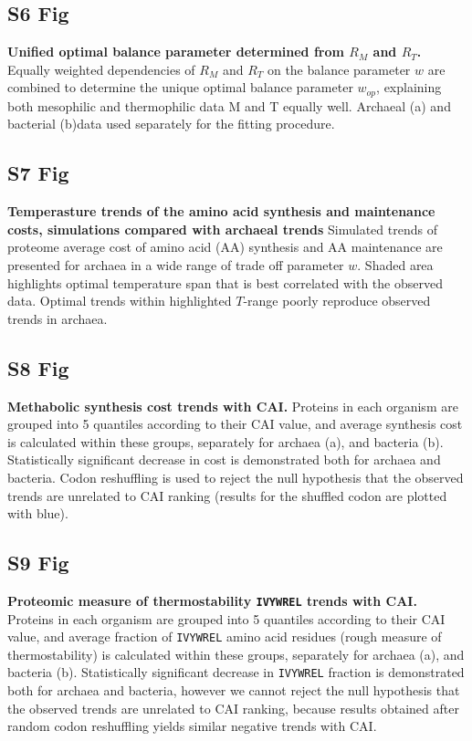 \documentclass[10pt,letterpaper]{article}
\begin{document}
\subsection*{S6 Fig}
\label{fig:s6}
{\bf Unified optimal balance parameter determined from $R_M$ and $R_T$.}
Equally weighted dependencies of $R_M$ and $R_T$ on the balance parameter $w$ are combined to determine the unique optimal balance parameter $w_{op}$, explaining both mesophilic and thermophilic data M and T equally well. Archaeal (a) and bacterial (b)data used separately for the fitting procedure.


\subsection*{S7 Fig}
\label{fig:s7}
{\bf Temperasture trends of the amino acid synthesis and maintenance costs, simulations compared with archaeal trends}
Simulated trends of proteome average cost of amino acid (AA) synthesis and AA maintenance are presented for archaea in a wide range of trade off parameter $w$. Shaded area highlights optimal temperature span that is best correlated with the observed data. Optimal trends within highlighted $T$-range poorly reproduce observed trends in archaea.


\subsection*{S8 Fig}
\label{fig:s8}
{\bf Methabolic synthesis cost trends with CAI.}
Proteins in each organism are grouped into 5 quantiles according to their CAI value, and average synthesis cost is calculated within these groups, separately for archaea (a), and bacteria (b). Statistically significant decrease in cost is demonstrated both for archaea and bacteria. Codon reshuffling is used to reject the null hypothesis that the observed trends are unrelated to CAI ranking (results for the shuffled codon are plotted with blue).


\subsection*{S9 Fig}
\label{fig:s9}
{\bf Proteomic measure of thermostability \texttt{IVYWREL} trends with CAI.}
Proteins in each organism are grouped into 5 quantiles according to their CAI value, and average fraction of \texttt{IVYWREL} amino acid residues (rough measure of thermostability) is calculated within these groups, separately for archaea (a), and bacteria (b). Statistically significant decrease in \texttt{IVYWREL} fraction is demonstrated both for archaea and bacteria, however we cannot reject the null hypothesis that the observed trends are unrelated to CAI ranking, because results obtained after random codon reshuffling yields similar negative trends with CAI.
\end{document}
